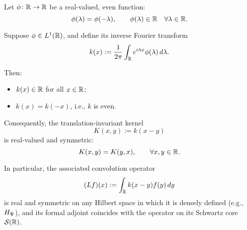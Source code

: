 \begin{lemma}
\label{lem:fourier_symmetry_reflection}
Let \( \phi \colon \mathbb{R} \to \mathbb{R} \) be a real-valued, even function:
\[
\phi(\lambda) = \phi(-\lambda), \qquad \phi(\lambda) \in \mathbb{R} \quad \forall \lambda \in \mathbb{R}.
\]

Suppose \( \phi \in L^1(\mathbb{R}) \), and define its inverse Fourier transform
\[
k(x) := \frac{1}{2\pi} \int_{\mathbb{R}} e^{i \lambda x} \phi(\lambda)\, d\lambda.
\]

Then:
\begin{itemize}
    \item \( k(x) \in \mathbb{R} \) for all \( x \in \mathbb{R} \);
    \item \( k(x) = k(-x) \), i.e., \( k \) is even.
\end{itemize}

\medskip
\noindent
Consequently, the translation-invariant kernel
\[
K(x,y) := k(x - y)
\]
is real-valued and symmetric:
\[
K(x,y) = K(y,x), \qquad \forall x, y \in \mathbb{R}.
\]

\medskip
\noindent
In particular, the associated convolution operator
\[
(Lf)(x) := \int_{\mathbb{R}} k(x - y) f(y)\, dy
\]
is real and symmetric on any Hilbert space in which it is densely defined (e.g., \( H_{\Psi} \)), and its formal adjoint coincides with the operator on its Schwartz core \( \mathcal{S}(\mathbb{R}) \).
\end{lemma}
